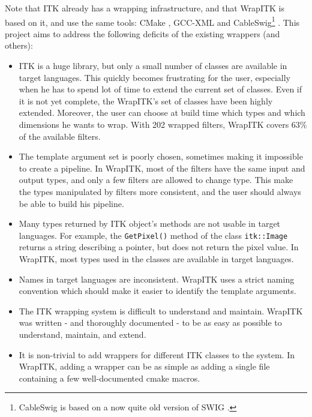 \documentclass{InsightArticle}
\begin{document}
Note that ITK already has a wrapping infrastructure, and that WrapITK is based
on it, and use the same tools: CMake \cite{CMakeWebSite}, GCC-XML \cite{GccxmlWebsite}
and CableSwig\footnote{CableSwig is based on a now quite old version of SWIG
\cite{SwigWebSite}.} \cite{CableSwigWebSite}. This project aims to
address the following deficits of the existing wrappers (and others):
\begin{itemize}
  \item  ITK is a huge library, but only a small number of classes are available
in target languages. This quickly becomes frustrating for the user, especially when
he has to spend lot of time to extend the current set of classes. Even if it is
not yet complete, the WrapITK's set of classes have been highly extended. Moreover,
the user can choose at build time which types and which dimensions he wants to wrap.
With 202 wrapped filters, WrapITK covers 63\% of the available filters.

  \item  The template argument set is poorly chosen, sometimes making it impossible
to create a pipeline. In WrapITK, most of the filters have the same input and output
types, and only a few filters are allowed to change type. This make the types manipulated 
by filters more consistent, and the user should always be able to build his pipeline.

  \item  Many types returned by ITK object's methods are not usable in target
languages. For example, the \verb$GetPixel()$ method of the class \verb$itk::Image$
returns a string describing a pointer, but does not return the pixel value. In WrapITK,
most types used in the classes are available in target languages.

  \item  Names in target languages are inconsistent. WrapITK uses a strict naming
convention which should make it easier to identify the template arguments.

  \item  The ITK wrapping system is difficult to understand and maintain. WrapITK was
written - and thoroughly documented - to be as easy as possible to understand,
maintain, and extend.

  \item  It is non-trivial to add wrappers for different ITK classes to the system. In
WrapITK, adding a wrapper can be as simple as adding a single file containing a
few well-documented cmake macros.


\end{itemize}
\end{document}
